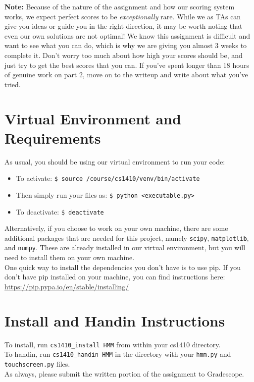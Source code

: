 \documentclass{article}
\begin{document}
\textbf{Note:} Because of the nature of the assignment and how our scoring system works, we expect perfect scores to be \textit{exceptionally} rare. While we as TAs can give you ideas or guide you in the right direction, it may be worth noting that even our own solutions are not optimal! We know this assignment is difficult and want to see what you can do, which is why we are giving you almost 3 weeks to complete it. Don't worry too much about how high your scores should be, and just try to get the best scores that you can. If you've spent longer than 18 hours of genuine work on part 2, move on to the writeup and write about what you've tried.
        
    \section{Virtual Environment and Requirements}
    As usual, you should be using our virtual environment to run your code:
    \begin{itemize}
    \setlength\itemsep{0em}
    \item[] To activate: \texttt{\$ source /course/cs1410/venv/bin/activate}
    \item[] Then simply run your files as: \texttt{\$ python <executable.py>}
    \item[] To deactivate: \texttt{\$ deactivate}
    \end{itemize}
    
    Alternatively, if you choose to work on your own machine, there are some additional packages that are needed for this project, namely \texttt{scipy}, \texttt{matplotlib}, and \texttt{numpy}. These are already installed in our virtual environment, but you will need to install them on your own machine.\\
    
    One quick way to install the dependencies you don't have is to use pip. If you don't have pip installed on your machine, you can find instructions here: \url{https://pip.pypa.io/en/stable/installing/}

    \section{Install and Handin Instructions}
    To install, run \verb|cs1410_install HMM| from within your cs1410 directory. ~\\

    To handin, run \verb|cs1410_handin HMM| in the directory with your \verb|hmm.py| and \verb|touchscreen.py| files. ~\\
    
    As always, please submit the written portion of the assignment to Gradescope.\\
    
\end{document}
